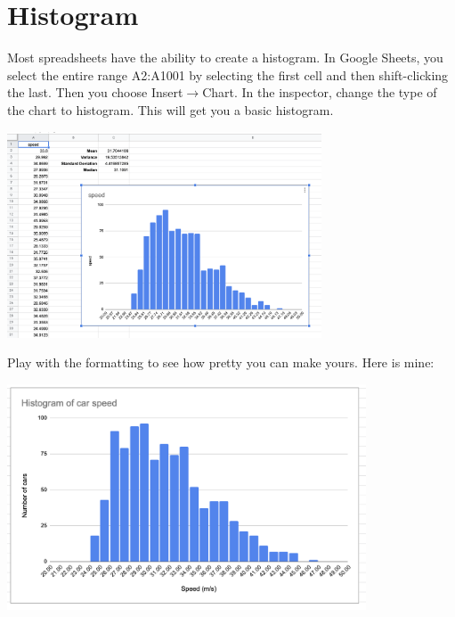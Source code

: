 \section{Histogram}

Most spreadsheets have the ability to create a histogram.  In Google
Sheets, you select the entire range A2:A1001 by selecting the first
cell and then shift-clicking the last. Then you choose
Insert$\rightarrow$Chart. In the inspector, change the type of the
chart to histogram. This will get you a basic histogram.

\includegraphics[width=0.7\textwidth]{default_histogram.png}

Play with the formatting to see how pretty you can make yours.  Here is mine:

\includegraphics[width=0.8\textwidth]{final_histogram.png}


